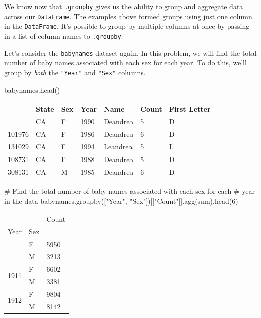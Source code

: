 \documentclass[
  letterpaper,
  DIV=11,
  numbers=noendperiod]{scrreprt}
\newenvironment{Shaded}{\begin{snugshade}}{\end{snugshade}}
\newcommand{\BuiltInTok}[1]{\textcolor[rgb]{0.00,0.23,0.31}{#1}}
\newcommand{\CommentTok}[1]{\textcolor[rgb]{0.37,0.37,0.37}{#1}}
\newcommand{\DecValTok}[1]{\textcolor[rgb]{0.68,0.00,0.00}{#1}}
\newcommand{\NormalTok}[1]{\textcolor[rgb]{0.00,0.23,0.31}{#1}}
\newcommand{\StringTok}[1]{\textcolor[rgb]{0.13,0.47,0.30}{#1}}
\begin{document}
We know now that \texttt{.groupby} gives us the ability to group and
aggregate data across our \texttt{DataFrame}. The examples above formed
groups using just one column in the \texttt{DataFrame}. It's possible to
group by multiple columns at once by passing in a list of column names
to \texttt{.groupby}.

Let's consider the \texttt{babynames} dataset again. In this problem, we
will find the total number of baby names associated with each sex for
each year. To do this, we'll group by \emph{both} the \texttt{"Year"}
and \texttt{"Sex"} columns.

\begin{Shaded}
\begin{Highlighting}[]
\NormalTok{babynames.head()}
\end{Highlighting}
\end{Shaded}

\begin{longtable}[]{@{}lllllll@{}}
\toprule\noalign{}
& State & Sex & Year & Name & Count & First Letter \\
\midrule\noalign{}
\endhead
\bottomrule\noalign{}
\endlastfoot
115957 & CA & F & 1990 & Deandrea & 5 & D \\
101976 & CA & F & 1986 & Deandrea & 6 & D \\
131029 & CA & F & 1994 & Leandrea & 5 & L \\
108731 & CA & F & 1988 & Deandrea & 5 & D \\
308131 & CA & M & 1985 & Deandrea & 6 & D \\
\end{longtable}

\begin{Shaded}
\begin{Highlighting}[]
\CommentTok{\# Find the total number of baby names associated with each sex for each }
\CommentTok{\# year in the data}
\NormalTok{babynames.groupby([}\StringTok{"Year"}\NormalTok{, }\StringTok{"Sex"}\NormalTok{])[[}\StringTok{"Count"}\NormalTok{]].agg(}\BuiltInTok{sum}\NormalTok{).head(}\DecValTok{6}\NormalTok{)}
\end{Highlighting}
\end{Shaded}

\begin{longtable}[]{@{}lll@{}}
\toprule\noalign{}
& & Count \\
Year & Sex & \\
\midrule\noalign{}
\endhead
\bottomrule\noalign{}
\endlastfoot
\multirow{2}{=}{1910} & F & 5950 \\
& M & 3213 \\
\multirow{2}{=}{1911} & F & 6602 \\
& M & 3381 \\
\multirow{2}{=}{1912} & F & 9804 \\
& M & 8142 \\
\end{longtable}
\end{document}
